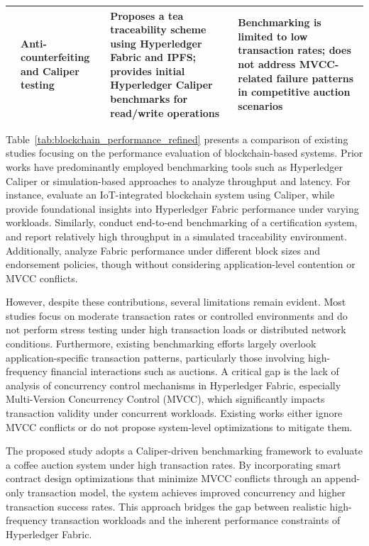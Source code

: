 \documentclass[12pt]{article}
\begin{document}
\begin{table}[h]
{\begin{tabular}{|p{2cm}|p{2.5cm}|p{5cm}|p{5cm}|}
				\hline
				
				\cite{chen_hyperledger_2023} & Anti-counterfeiting and Caliper testing & 
				Proposes a tea traceability scheme using Hyperledger Fabric and IPFS; provides initial Hyperledger Caliper benchmarks for read/write operations & 
				Benchmarking is limited to low transaction rates; does not address MVCC-related failure patterns in competitive auction scenarios \\ 
				
				\hline
				
				
			\end{tabular}
		}
	\end{table}
	
	
Table~\ref{tab:blockchain_performance_refined} presents a comparison of existing studies focusing on the performance evaluation of blockchain-based systems. Prior works have predominantly employed benchmarking tools such as Hyperledger Caliper or simulation-based approaches to analyze throughput and latency. For instance, \cite{kaushal_convergence_2025} evaluate an IoT-integrated blockchain system using Caliper, while \cite{thakkar_performance_2018} provide foundational insights into Hyperledger Fabric performance under varying workloads. Similarly, \cite{talib_blockchain-enabled_2026} conduct end-to-end benchmarking of a certification system, and \cite{sugandh_approach_2023} report relatively high throughput in a simulated traceability environment. Additionally, \cite{el_hajji_optimization_2024} analyze Fabric performance under different block sizes and endorsement policies, though without considering application-level contention or MVCC conflicts.
	
	However, despite these contributions, several limitations remain evident. Most studies focus on moderate transaction rates or controlled environments and do not perform stress testing under high transaction loads or distributed network conditions. Furthermore, existing benchmarking efforts largely overlook application-specific transaction patterns, particularly those involving high-frequency financial interactions such as auctions. A critical gap is the lack of analysis of concurrency control mechanisms in Hyperledger Fabric, especially Multi-Version Concurrency Control (MVCC), which significantly impacts transaction validity under concurrent workloads. Existing works either ignore MVCC conflicts or do not propose system-level optimizations to mitigate them.
	
	The proposed study adopts a Caliper-driven benchmarking framework to evaluate a coffee auction system under high transaction rates. By incorporating smart contract design optimizations that minimize MVCC conflicts through an append-only transaction model, the system achieves improved concurrency and higher transaction success rates. This approach bridges the gap between realistic high-frequency transaction workloads and the inherent performance constraints of Hyperledger Fabric.	
	
\end{document}
